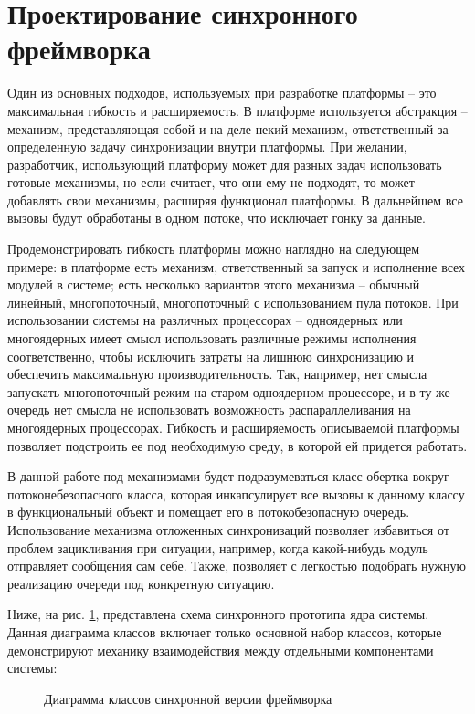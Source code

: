 \section{Проектирование синхронного фреймворка}

Один из основных подходов, используемых при разработке платформы – это максимальная гибкость и расширяемость. В платформе используется абстракция – механизм, представляющая собой и на деле некий механизм, ответственный за определенную задачу синхронизации внутри платформы. При желании, разработчик, использующий платформу может для разных задач использовать готовые механизмы, но если считает, что они ему не подходят, то может добавлять свои механизмы, расширяя функционал платформы. В дальнейшем все вызовы будут обработаны в одном потоке, что исключает гонку за данные.

Продемонстрировать гибкость платформы можно наглядно на следующем примере: в платформе есть механизм, ответственный за запуск и исполнение всех модулей в системе; есть несколько вариантов этого механизма – обычный линейный, многопоточный, многопоточный с использованием пула потоков. При использовании системы на различных процессорах – одноядерных или многоядерных имеет смысл использовать различные режимы исполнения соответственно, чтобы исключить затраты на лишнюю синхронизацию и обеспечить максимальную производительность. Так, например, нет смысла запускать многопоточный режим на старом одноядерном процессоре, и в ту же очередь нет смысла не использовать возможность распараллеливания на многоядерных процессорах. Гибкость и расширяемость описываемой платформы позволяет подстроить ее под необходимую среду, в которой ей придется работать.

В данной работе под механизмами будет подразумеваться класс-обертка вокруг потоконебезопасного класса, которая инкапсулирует все вызовы к данному классу в функциональный объект и помещает его в потокобезопасную очередь. Использование механизма отложенных синхронизаций позволяет избавиться от проблем зацикливания при ситуации, например, когда какой-нибудь модуль отправляет сообщения сам себе. Также, позволяет с легкостью подобрать нужную реализацию очереди под конкретную ситуацию. 

Ниже, на рис. \ref{im:2_2_1_sync}, представлена схема синхронного прототипа ядра системы. Данная диаграмма классов включает только основной набор классов, которые демонстрируют механику взаимодействия между отдельными компонентами системы:

\begin{figure}[h]
    \caption{Диаграмма классов синхронной версии фреймворка}
    \label{im:2_2_1_sync}
\end{figure}

